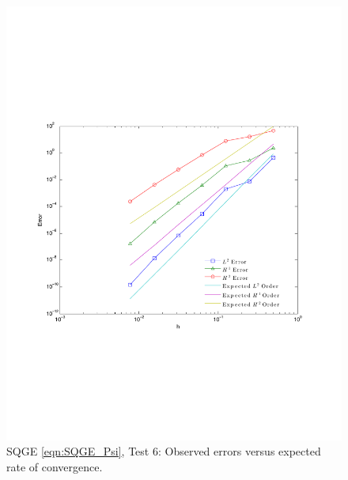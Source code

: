 \begin{figure}
  \begin{center}
    \includegraphics[scale=0.5]{Figures/SQGEeConvergence.pdf}
    \caption{SQGE \eqref{eqn:SQGE_Psi}, Test 6: Observed errors versus expected
      rate of convergence.}
    \label{fig:SQGEeErrors}
  \end{center}
\end{figure}

